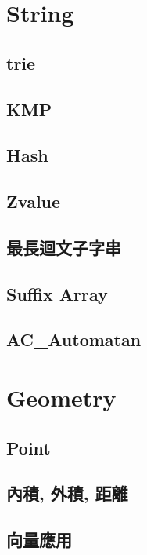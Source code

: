 \section{String}
\subsection{trie} 

\subsection{KMP} 

\subsection{Hash} 

\subsection{Zvalue} 

\subsection{最長迴文子字串} 

\subsection{Suffix Array} 

\subsection{AC_Automatan} 


\section{Geometry}
\subsection{Point} 

\subsection{內積, 外積, 距離} 

\subsection{向量應用} 

